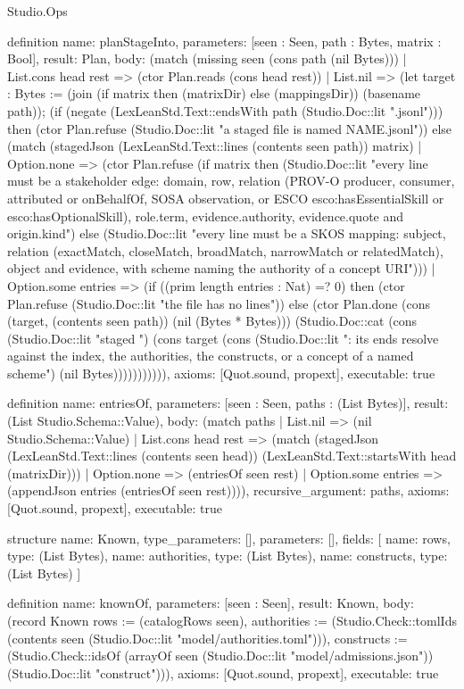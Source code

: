 \begin{lexlean}{Studio.Ops}
\begin{semanticmodule}
{definition{
  name: planStageInto,
  parameters: [seen : Seen, path : Bytes, matrix : Bool],
  result: Plan,
  body: (match (missing seen (cons path (nil Bytes)))
    | List.cons head rest => (ctor Plan.reads (cons head rest))
    | List.nil => (let target : Bytes := (join (if matrix then (matrixDir) else (mappingsDir)) (basename path)); (if (negate (LexLeanStd.Text::endsWith path (Studio.Doc::lit ".jsonl"))) then (ctor Plan.refuse (Studio.Doc::lit "a staged file is named NAME.jsonl\n")) else (match (stagedJson (LexLeanStd.Text::lines (contents seen path)) matrix)
      | Option.none => (ctor Plan.refuse (if matrix then (Studio.Doc::lit "every line must be a stakeholder edge: domain, row, relation (PROV-O producer, consumer, attributed or onBehalfOf, SOSA observation, or ESCO esco:hasEssentialSkill or esco:hasOptionalSkill), role.term, evidence.authority, evidence.quote and origin.kind\n") else (Studio.Doc::lit "every line must be a SKOS mapping: subject, relation (exactMatch, closeMatch, broadMatch, narrowMatch or relatedMatch), object and evidence, with scheme naming the authority of a concept URI\n")))
      | Option.some entries => (if ((prim length entries : Nat) =? 0) then (ctor Plan.refuse (Studio.Doc::lit "the file has no lines\n")) else (ctor Plan.done (cons (target, (contents seen path)) (nil (Bytes * Bytes))) (Studio.Doc::cat (cons (Studio.Doc::lit "staged ") (cons target (cons (Studio.Doc::lit ": its ends resolve against the index, the authorities, the constructs, or a concept of a named scheme\n") (nil Bytes))))))))))),
  axioms: [Quot.sound, propext],
  executable: true
}

definition{
  name: entriesOf,
  parameters: [seen : Seen, paths : (List Bytes)],
  result: (List Studio.Schema::Value),
  body: (match paths
    | List.nil => (nil Studio.Schema::Value)
    | List.cons head rest => (match (stagedJson (LexLeanStd.Text::lines (contents seen head)) (LexLeanStd.Text::startsWith head (matrixDir)))
      | Option.none => (entriesOf seen rest)
      | Option.some entries => (appendJson entries (entriesOf seen rest)))),
  recursive_argument: paths,
  axioms: [Quot.sound, propext],
  executable: true
}

structure{
  name: Known,
  type_parameters: [],
  parameters: [],
  fields: [
    {name: rows, type: (List Bytes)},
    {name: authorities, type: (List Bytes)},
    {name: constructs, type: (List Bytes)}
  ]
}

definition{
  name: knownOf,
  parameters: [seen : Seen],
  result: Known,
  body: (record Known {rows := (catalogRows seen), authorities := (Studio.Check::tomlIds (contents seen (Studio.Doc::lit "model/authorities.toml"))), constructs := (Studio.Check::idsOf (arrayOf seen (Studio.Doc::lit "model/admissions.json")) (Studio.Doc::lit "construct"))}),
  axioms: [Quot.sound, propext],
  executable: true
}

}
\end{semanticmodule}
\end{lexlean}
